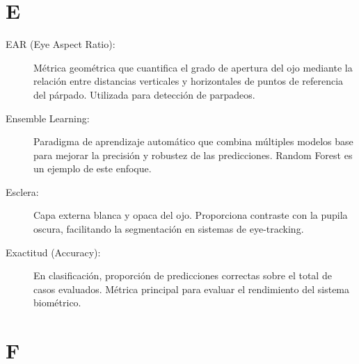 \section*{E}

\begin{description}
    \item[EAR (Eye Aspect Ratio):] Métrica geométrica que cuantifica el grado de apertura del ojo mediante la relación entre distancias verticales y horizontales de puntos de referencia del párpado. Utilizada para detección de parpadeos.
    
    \item[Ensemble Learning:] Paradigma de aprendizaje automático que combina múltiples modelos base para mejorar la precisión y robustez de las predicciones. Random Forest es un ejemplo de este enfoque.
    
    \item[Esclera:] Capa externa blanca y opaca del ojo. Proporciona contraste con la pupila oscura, facilitando la segmentación en sistemas de eye-tracking.
    
    \item[Exactitud (Accuracy):] En clasificación, proporción de predicciones correctas sobre el total de casos evaluados. Métrica principal para evaluar el rendimiento del sistema biométrico.
\end{description}

\section*{F}

